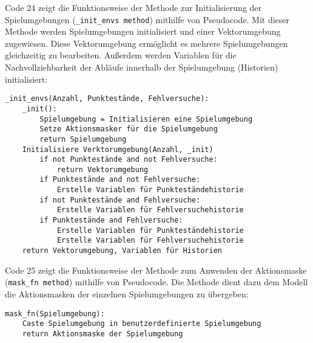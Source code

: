 \begin{minipage}{\linewidth}
Code 24 zeigt die Funktionsweise der Methode zur Initialisierung der Spielumgebungen (\texttt{\_init\_envs method}) mithilfe von Pseudocode. Mit dieser Methode werden Spielumgebungen initialisiert und einer Vektorumgebung zugewiesen. Diese Vektorumgebung ermöglicht es mehrere Spielumgebungen gleichzeitig zu bearbeiten. Außerdem werden Variablen für die Nachvollziehbarkeit der Abläufe innerhalb der Spielumgebung (Historien) initialisiert:
\vspace{0.5cm}
\begin{lstlisting}[caption={Methode zur Initialisierung der Spielumgebungen},morekeywords={Anzahl, Punktestände, Fehlversuche}]
_init_envs(Anzahl, Punktestände, Fehlversuche):
	_init():
		Spielumgebung = Initialisieren eine Spielumgebung
		Setze Aktionsmasker für die Spielumgebung
		return Spielumgebung
	Initialisiere Verktorumgebung(Anzahl, _init)
		if not Punktestände and not Fehlversuche:
			return Vektorumgebung
		if Punktestände and not Fehlversuche:
			Erstelle Variablen für Punkteständehistorie
		if not Punktestände and Fehlversuche:
			Erstelle Variablen für Fehlversuchehistorie
		if Punktestände and Fehlversuche:
			Erstelle Variablen für Punkteständehistorie
			Erstelle Variablen für Fehlversuchehistorie
	return Vektorumgebung, Variablen für Historien
\end{lstlisting}
\end{minipage}

\begin{minipage}{\linewidth}
Code 25 zeigt die Funktionsweise der Methode zum Anwenden der Aktionsmaske (\texttt{mask\_fn method}) mithilfe von Pseudocode. Die Methode dient dazu dem Modell die Aktionsmasken der einzelnen Spielumgebungen zu übergeben:
\vspace{0.5cm}
\begin{lstlisting}[caption={Methode zum Anwenden der Aktionsmaske},morekeywords={Spielumgebung}]
mask_fn(Spielumgebung):
	Caste Spielumgebung in benutzerdefinierte Spielumgebung
	return Aktionsmaske der Spielumgebung
\end{lstlisting}
\end{minipage}


